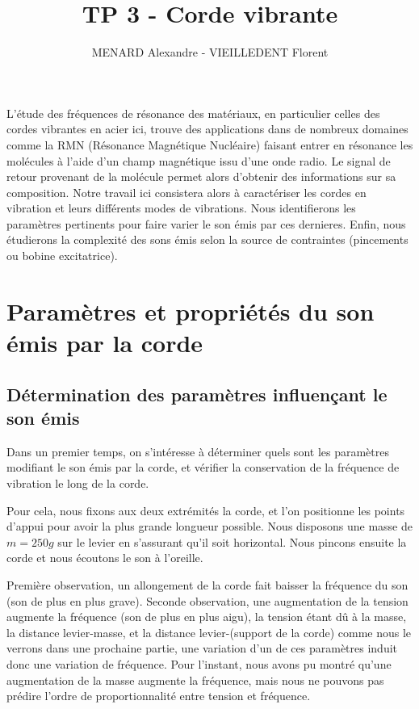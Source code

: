 \documentclass[12pt]{article}
\title{\vspace{-2cm}\textbf{TP 3 - Corde vibrante}}
\author{\vspace{-0.5cm}MENARD Alexandre - VIEILLEDENT Florent}
\date{\vspace{-0.7cm}}
\begin{document}
\maketitle

L'étude des fréquences de résonance des matériaux, en particulier celles des cordes vibrantes en acier ici, trouve des applications dans de nombreux domaines 
comme la RMN (Résonance Magnétique Nucléaire) faisant entrer en résonance les molécules à l'aide d'un champ magnétique issu d'une onde radio. Le signal de retour provenant
de la molécule permet alors d'obtenir des informations sur sa composition. 
Notre travail ici consistera alors à caractériser les cordes en vibration et leurs différents modes de vibrations. Nous identifierons les paramètres pertinents pour faire
varier le son émis par ces dernieres. Enfin, nous étudierons la complexité des sons émis selon la source de contraintes (pincements ou bobine excitatrice).

\section{Paramètres et propriétés du son émis par la corde}
\subsection{Détermination des paramètres influençant le son émis}

Dans un premier temps, on s'intéresse à déterminer quels sont les paramètres modifiant le son émis par la corde, et vérifier la conservation de la fréquence 
de vibration le long de la corde.

Pour cela, nous fixons aux deux extrémités la corde, et l'on positionne les points d'appui pour avoir la plus grande longueur possible. Nous disposons une masse de $m=250g$ sur le levier
en s'assurant qu'il soit horizontal. Nous pincons ensuite la corde et nous écoutons le son à l'oreille.

Première observation, un allongement de la corde fait baisser la fréquence du son (son de plus en plus grave). 
Seconde observation, une augmentation de la tension augmente la fréquence (son de plus en plus aigu), la tension étant dû à la masse, la distance levier-masse, et la distance
levier-(support de la corde) comme nous le verrons dans une prochaine partie, une variation d'un de ces paramètres induit donc une variation de fréquence. Pour l'instant, 
nous avons pu montré qu'une augmentation de la masse augmente la fréquence, mais nous ne pouvons pas prédire l'ordre de proportionnalité entre tension et fréquence.
\end{document}

